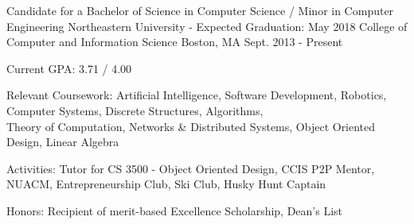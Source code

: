 


\begin{cventries}

  \cventry
    {Candidate for a Bachelor of Science in Computer Science / Minor in Computer Engineering} %
    {Northeastern University - Expected Graduation: May 2018 \newline College of Computer and Information Science} %
    {Boston, MA} %
    {Sept. 2013 - Present} %
    {
      \begin{cvitems} %
        \item {Current GPA: 3.71 / 4.00}
        \item {Relevant Coursework: Artificial Intelligence, Software Development, Robotics, Computer Systems, Discrete Structures, Algorithms,\\
            \hspace*{3.11cm} Theory of Computation, Networks \& Distributed Systems, Object Oriented Design, Linear Algebra}
        \item {Activities: Tutor for CS 3500 - Object Oriented Design, CCIS P2P Mentor, NUACM, Entrepreneurship Club, Ski Club, Husky Hunt Captain}
        \item {Honors: Recipient of merit-based Excellence Scholarship, Dean's List}
      \end{cvitems}
    }

\end{cventries}
